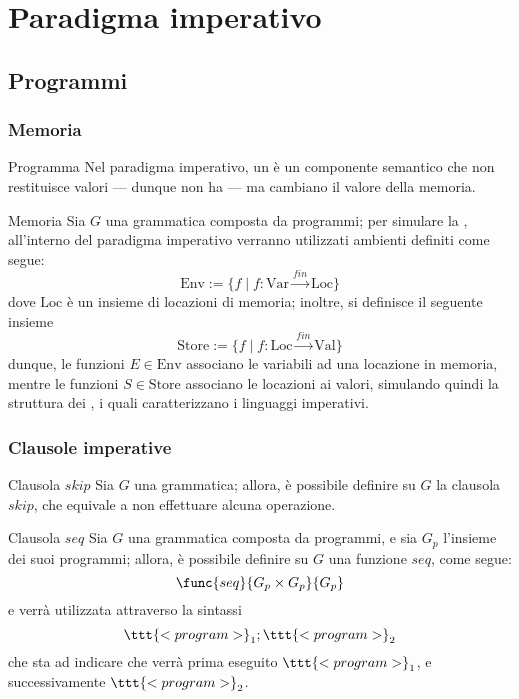 \documentclass[a4paper, 12pt]{report}
\begin{document}
    \chapter{Paradigma imperativo}

    \section{Programmi}
    
    \subsection{Memoria}

    \begin{frameddefn}{Programma}
        Nel paradigma imperativo, un  è un componente semantico che non restituisce valori --- dunque non ha  --- ma cambiano il valore della memoria.
    \end{frameddefn}

    \begin{frameddefn}[label={store}]{Memoria}
        Sia $G$ una grammatica composta da programmi; per simulare la , all'interno del paradigma imperativo verranno utilizzati ambienti definiti come segue: $$\mathrm{Env} := \{f \mid f : \mathrm{Var} \xrightarrow{fin} \mathrm{Loc} \}$$ dove $\mathrm{Loc}$ è un insieme di locazioni di memoria; inoltre, si definisce il seguente insieme $$\mathrm{Store} := \{f \mid f : \mathrm{Loc} \xrightarrow{fin} \mathrm{Val} \}$$ dunque, le funzioni $E \in \mathrm{Env}$ associano le variabili ad una locazione in memoria, mentre le funzioni $S \in \mathrm{Store}$ associano le locazioni ai valori, simulando quindi la struttura dei , i quali caratterizzano i linguaggi imperativi.
    \end{frameddefn}

    \subsection{Clausole imperative}

    \begin{frameddefn}{Clausola $skip$}
        Sia $G$ una grammatica; allora, è possibile definire su $G$ la clausola $skip$, che equivale a non effettuare alcuna operazione.
    \end{frameddefn}
    
    \begin{frameddefn}{Clausola $seq$}
        Sia $G$ una grammatica composta da programmi, e sia $G_p$ l'insieme dei suoi programmi; allora, è possibile definire su $G$ una funzione $seq$, come segue: $$\func{seq}{G_p \times G_p}{G_p}$$ e verrà utilizzata attraverso la sintassi $$\ttt{<program>}_1;\ttt{<program>}_2$$ che sta ad indicare che verrà prima eseguito $\ttt{<program>}_1$, e successivamente $\ttt{<program>}_2$.
    \end{frameddefn}
\end{document}
